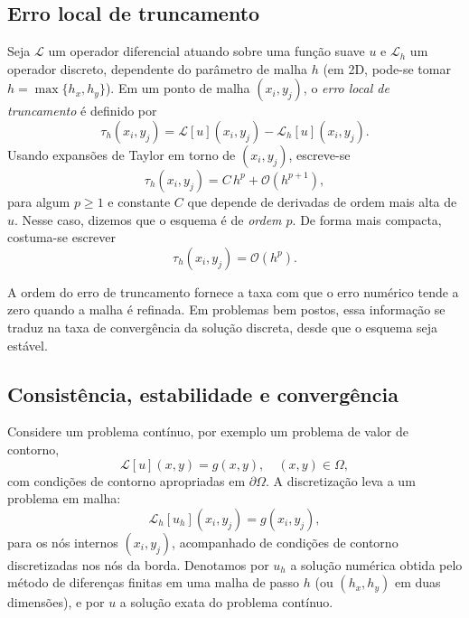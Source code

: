 \subsection{Erro local de truncamento}

Seja $\mathcal{L}$ um operador diferencial atuando sobre uma função suave 
$u$ e $\mathcal{L}_h$ um operador discreto, dependente do parâmetro de malha 
$h$ (em 2D, pode-se tomar $h = \max\{h_x,h_y\}$). Em um ponto de malha 
$(x_i,y_j)$, o \emph{erro local de truncamento} é definido por
\begin{equation}
    \tau_h(x_i,y_j) 
    = \mathcal{L}[u](x_i,y_j) - \mathcal{L}_h[u](x_i,y_j).
\end{equation}
Usando expansões de Taylor em torno de $(x_i,y_j)$, escreve-se
\begin{equation}
    \tau_h(x_i,y_j) = C\,h^p + \mathcal{O}(h^{p+1}),
\end{equation}
para algum $p \ge 1$ e constante $C$ que depende de derivadas de ordem mais 
alta de $u$. Nesse caso, dizemos que o esquema é de \emph{ordem $p$}. De 
forma mais compacta, costuma-se escrever
\begin{equation}
    \tau_h(x_i,y_j) = \mathcal{O}(h^p).
\end{equation}

A ordem do erro de truncamento fornece a taxa com que o erro numérico tende 
a zero quando a malha é refinada. Em problemas bem postos, essa informação 
se traduz na taxa de convergência da solução discreta, desde que o esquema 
seja estável.

\subsection{Consistência, estabilidade e convergência}

Considere um problema contínuo, por exemplo um problema de valor de contorno,
\begin{equation}
    \mathcal{L}[u](x,y) = g(x,y), \quad (x,y) \in \Omega,
\end{equation}
com condições de contorno apropriadas em $\partial\Omega$. A discretização 
leva a um problema em malha:
\begin{equation}
    \mathcal{L}_h[u_h](x_i,y_j) = g(x_i,y_j),
\end{equation}
para os nós internos $(x_i,y_j)$, acompanhado de condições de contorno 
discretizadas nos nós da borda. Denotamos por $u_h$ a solução numérica 
obtida pelo método de diferenças finitas em uma malha de passo $h$ 
(ou $(h_x,h_y)$ em duas dimensões), e por $u$ a solução exata do 
problema contínuo.

